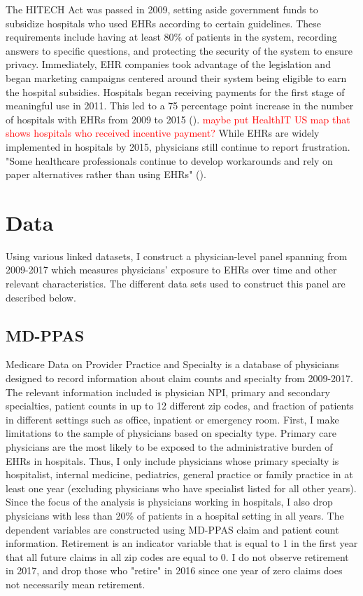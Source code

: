 \documentclass[11pt]{article}
\begin{document}
The HITECH Act was passed in 2009, setting aside government funds to subsidize hospitals who used EHRs according to certain guidelines. These requirements include having at least 80\% of patients in the system, recording answers to specific questions, and protecting the security of the system to ensure privacy. Immediately, EHR companies took advantage of the legislation and began marketing campaigns centered around their system being eligible to earn the hospital subsidies. Hospitals began receiving payments for the first stage of meaningful use in 2011. This led to a 75 percentage point increase in the number of hospitals with EHRs from 2009 to 2015 (\cite{stats}). \textcolor{red}{maybe put HealthIT US map that shows hospitals who received incentive payment?} While EHRs are widely implemented in hospitals by 2015, physicians still continue to report frustration. "Some healthcare professionals continue to develop workarounds and rely on paper alternatives rather than using EHRs" (\cite{evans2016electronic}).  

\section{Data}

Using various linked datasets, I construct a physician-level panel spanning from 2009-2017 which measures physicians' exposure to EHRs over time and other relevant characteristics. The different data sets used to construct this panel are described below.

\subsection{MD-PPAS}

Medicare Data on Provider Practice and Specialty is a database of physicians designed to record information about claim counts and specialty from 2009-2017. The relevant information included is physician NPI, primary and secondary specialties, patient counts in up to 12 different zip codes, and fraction of patients in different settings such as office, inpatient or emergency room. First, I make limitations to the sample of physicians based on specialty type. Primary care physicians are the most likely to be exposed to the administrative burden of EHRs in hospitals. Thus, I only include physicians whose primary specialty is hospitalist, internal medicine, pediatrics, general practice or family practice in at least one year (excluding physicians who have specialist listed for all other years). Since the focus of the analysis is physicians working in hospitals, I also drop physicians with less than 20\% of patients in a hospital setting in all years. 
The dependent variables are constructed using MD-PPAS claim and patient count information. Retirement is an indicator variable that is equal to 1 in the first year that all future claims in all zip codes are equal to 0. I do not observe retirement in 2017, and drop those who "retire" in 2016 since one year of zero claims does not necessarily mean retirement.  
\end{document}

